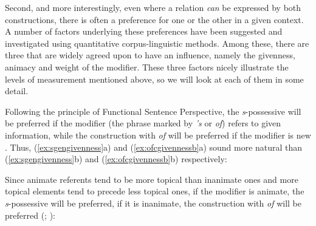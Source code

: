 Second, and more interestingly, even where a relation \textit{can} be expressed by both constructions, there is often a preference for one or the other in a given context. A number of factors underlying these preferences have been suggested and investigated using quantitative  corpus\hyp{}linguistic methods. Among these, there are three that are widely agreed upon to have an influence, namely the givenness,  animacy  and weight  of the modifier. These three factors nicely illustrate the levels of measurement  mentioned above, so we will look at each of them in some detail.

\begin{description}[leftmargin=*]
\item[(a) Givenness]  Following the principle of Functional Sentence Perspective, the \textit{s}-possessive  will be preferred if the modifier (the phrase marked by \textit{'s} or \textit{of}) refers to given information, while the construction with \textit{of} will be preferred if the modifier is new \citep{standwell_genitive_1982}. Thus, (\ref{ex:sgengivenness}a) and (\ref{ex:ofcgivennessb}a) sound more natural than (\ref{ex:sgengivenness}b) and (\ref{ex:ofcgivennessb}b) respectively:

\begin{exe}
\ex
\begin{xlist}
\label{ex:sgengivenness}
\end{xlist}
\ex
\begin{xlist}
\label{ex:ofcgivennessb}
\end{xlist}
\end{exe}

\item[(b) Animacy]  Since animate referents tend to be more topical than inanimate ones and more topical elements tend to precede less topical ones, if the modifier is animate,  the \textit{s}-possessive  will be preferred, if it is inanimate, the construction with \textit{of} will be preferred (\citealt[cf.][192-203]{quirk_grammar_1972}; \citealt{deane_english_1987}):


\end{description}
